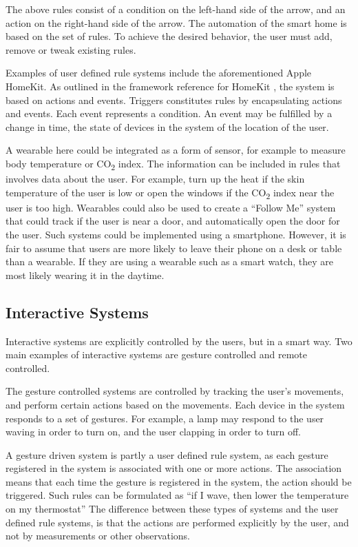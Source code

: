 The above rules consist of a condition on the left-hand side of the arrow, 
and an action on the right-hand side of the arrow.
The automation of the smart home is based on the set of rules. 
To achieve the desired behavior, the user must add, remove or tweak existing rules.

Examples of user defined rule systems include the aforementioned Apple HomeKit. 
As outlined in the framework reference for HomeKit \cite{applehomekitref}, 
the system is based on actions and events. 
Triggers constitutes rules by encapsulating actions and events. 
Each event represents a condition. 
An event may be fulfilled by a change in time, 
the state of devices in the system of the location of the user.

A wearable here could be integrated as a form of sensor, for example to measure body temperature or CO\textsubscript{2} index.
The information can be included in rules that involves data about the user. For example, turn up the heat if the skin temperature of the user is low or open the windows if the CO\textsubscript{2} index near the user is too high.
Wearables could also be used to create a ``Follow Me'' system that could track if the user is near \eg a door, and automatically open the door for the user. Such systems could be implemented using a smartphone. However, it is fair to assume that users are more likely to leave their phone on a desk or table than a wearable. If they are using a wearable such as a smart watch, they are most likely wearing it in the daytime.

\subsection{Interactive Systems}

Interactive systems are explicitly controlled by the users, but in a smart way. 
Two main examples of interactive systems are gesture controlled and remote controlled. 

The gesture controlled systems are controlled by tracking the user's movements, 
and perform certain actions based on the movements.
Each device in the system responds to a set of gestures. 
For example, a lamp may respond to the user waving in order to turn on, 
and the user clapping in order to turn off.

A gesture driven system is partly a user defined rule system, 
as each gesture registered in the system is associated with one or more actions.
The association means that each time the gesture is registered in the system, the action should be triggered. 
Such rules can be formulated as ``if I wave, then lower the temperature on my thermostat''
The difference between these types of systems and the user defined rule systems, 
is that the actions are performed explicitly by the user, 
and not by measurements or other observations.

